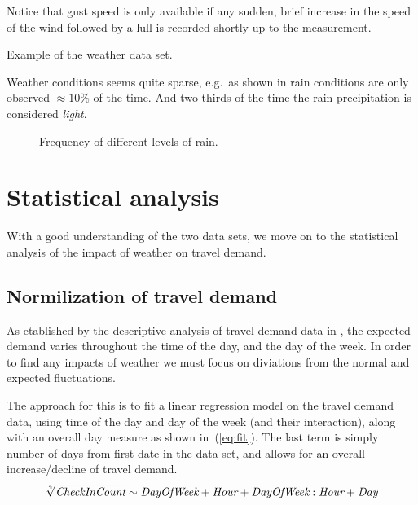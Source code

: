 \documentclass[a4paper,11pt]{article}
\begin{document}
Notice that gust speed is only available if any sudden, brief increase in the speed of the wind followed by a lull is recorded shortly up to the measurement.
 
\begin{table}[!ht]
    \center
    \resizebox{\linewidth}{!}{
    
    }
    \caption{Example of the weather data set.}
    \label{tab:weather_data_example}
\end{table}

Weather conditions seems quite sparse, e.g.\ as shown in  rain conditions are only observed $\approx10 \%$ of the time. And two thirds of the time the rain precipitation is considered \emph{light}.

\begin{figure}[!ht]
    \center
    
    \caption{Frequency of different levels of rain.}
    \label{fig:weather_hist}
\end{figure}

\clearpage

\section{Statistical analysis}
With a good understanding of the two data sets, we move on to the statistical analysis of the impact of weather on travel demand.

\subsection{Normilization of travel demand}
As etablished by the descriptive analysis of travel demand data in , the expected demand varies throughout the time of the day, and the day of the week. In order to find any impacts of weather we must focus on diviations from the normal and expected fluctuations.

The approach for this is to fit a linear regression model on the travel demand data, using time of the day and day of the week (and their interaction), along with an overall day measure as shown in~(\ref{eq:fit}). The last term is simply number of days from first date in the data set, and allows for an overall increase/decline of travel demand. 
\begin{equation}
    \sqrt[\leftroot{0}\uproot{2}4]{\textit{CheckInCount}} \sim \textit{DayOfWeek} + \textit{Hour} + \textit{DayOfWeek}:\textit{Hour} + \textit{Day}    
    \label{eq:fit}
\end{equation}
\end{document}
